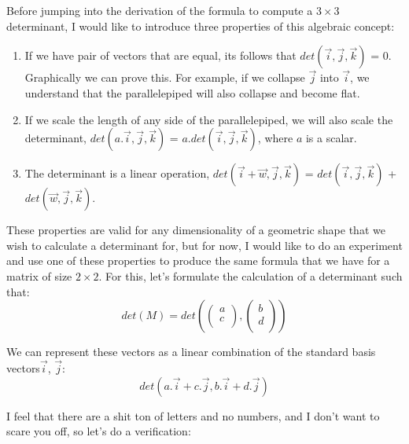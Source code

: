 \documentclass[a4,12pt,twosided,openany]{memoir}
\begin{document}
Before jumping into the derivation of the formula to compute a $3 \times 3$ determinant, I would like to introduce three properties of this algebraic concept:
\begin{tcolorbox}
\begin{enumerate}
\item If we have pair of vectors that are equal, its follows that  $det(\overrightarrow{i}, \overrightarrow{j}, \overrightarrow{k})$ = 0. Graphically we can prove this. For example, if we collapse $\overrightarrow{j}$ into $\overrightarrow{i}$, we understand that the parallelepiped will also collapse and become flat.
\item If we scale the length of any side of the parallelepiped, we will also scale the determinant, $det(a.\overrightarrow{i}, \overrightarrow{j}, \overrightarrow{k})$ = $a.det(\overrightarrow{i}, \overrightarrow{j}, \overrightarrow{k})$, where $a$ is a scalar.
\item The determinant is a linear operation, $det(\overrightarrow{i} + \overrightarrow{w}, \overrightarrow{j}, \overrightarrow{k})$ =  $det(\overrightarrow{i}, \overrightarrow{j}, \overrightarrow{k})$ + $det(\overrightarrow{w}, \overrightarrow{j}, \overrightarrow{k})$.
\end{enumerate}
\end{tcolorbox}
These properties are valid for any dimensionality of a geometric shape that we wish to calculate a determinant for, but for now, I would like to do an experiment and use one of these properties to produce the same formula that we have for a matrix of size $2 \times 2$. For this, let’s formulate the calculation of a determinant such that:
\[det(M) = det \left(\begin{pmatrix}
a\\
c\\
\end{pmatrix},\begin{pmatrix}
b\\
d\\
\end{pmatrix} \right)\]
\par 
\indent
We can represent these vectors as a linear combination of the standard basis vectors$\overrightarrow{i}$, $\overrightarrow{j}$:
\begin{equation}\label{eq:deteq}
det(a.\overrightarrow{i} + c.\overrightarrow{j},  b.\overrightarrow{i} + d.\overrightarrow{j})
\end{equation}
\par 
\indent
I feel that there are a shit ton of letters and no numbers, and I don’t want to scare you off, so let’s do a verification:
\end{document}
